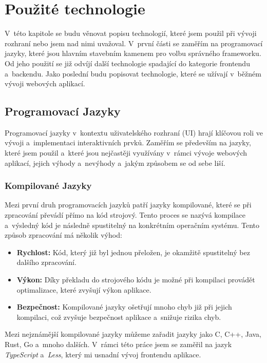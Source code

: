 \chapter{Použité technologie}
\label{ch:technology}
V~této kapitole se budu věnovat popisu technologií, které jsem použil při vývoji rozhraní nebo jsem nad nimi uvažoval. V~první části se zaměřím na programovací jazyky, které jsou hlavním stavebním kamenem pro volbu správného frameworku. Od jeho použití se již odvíjí další technologie spadající do kategorie frontendu a~backendu. Jako poslední budu popisovat technologie, které se užívají v~běžném vývoji webových aplikací.

\section{Programovací Jazyky}
\label{sec:languages}
Programovací jazyky v~kontextu uživatelského rozhraní (UI) hrají klíčovou roli ve vývoji a~implementaci interaktivních prvků. Zaměřím se především na jazyky, které jsem použil a~které jsou nejčastěji využívány v~rámci vývoje webových aplikací, jejich výhody a~nevýhody a~jakým způsobem se od sebe liší.

\subsection{Kompilované Jazyky}
\label{subsec:languages-compiled}
Mezi první druh programovacích jazyků patří jazyky kompilované, které se při zpracování převádí přímo na kód strojový. Tento proces se nazývá kompilace a~výsledný kód je následně spustitelný na konkrétním operačním systému. Tento způsob zpracování má několik výhod:

\begin{itemize}
    \item \textbf{Rychlost:} Kód, který již byl jednou přeložen, je okamžitě spustitelný bez dalšího zpracování.
    \item \textbf{Výkon:} Díky překladu do strojového kódu je možné při kompilaci provádět optimalizace, které zvyšují výkon aplikace.
    \item \textbf{Bezpečnost:} Kompilované jazyky ošetřují mnoho chyb již při jejich kompilaci, což zvyšuje bezpečnost aplikace a~snižuje rizika chyb.
\end{itemize}

Mezi nejznámější kompilované jazyky můžeme zařadit jazyky jako C, C++, Java, Rust, Go a~mnoho dalších. V~rámci této práce jsem se zaměřil na jazyk \textit{TypeScript} a~\textit{Less}, který mi usnadní vývoj frontendu aplikace.

